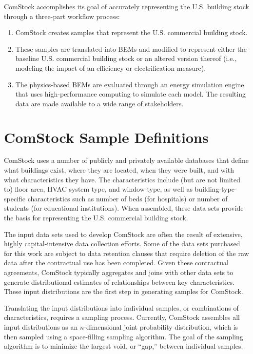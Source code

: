 \pagebreak

ComStock accomplishes its goal of accurately representing the U.S. building stock through a three-part workflow process: \begin{enumerate}
    \item ComStock creates samples that represent the U.S. commercial building stock.
    \item These samples are translated into BEMs and modified to represent either the baseline U.S. commercial building stock or an altered version thereof (i.e., modeling the impact of an efficiency or electrification measure).
    \item The physics-based BEMs are evaluated through an energy simulation engine that uses high-performance computing to simulate each model. The resulting data are made available to a wide range of stakeholders.
\end{enumerate}

\section{ComStock Sample Definitions}
\label{sec:sample_definitions}

ComStock uses a number of publicly and privately available databases that define what buildings exist, where they are located, when they were built, and with what characteristics they have. The characteristics include (but are not limited to) floor area, HVAC system type, and window type, as well as building-type-specific characteristics such as number of beds (for hospitals) or number of students (for educational institutions). When assembled, these data sets provide the basis for representing the U.S. commercial building stock.

The input data sets used to develop ComStock are often the result of extensive, highly capital-intensive data collection efforts. Some of the data sets purchased for this work are subject to data retention clauses that require deletion of the raw data after the contractual use has been completed. Given these contractual agreements, ComStock typically aggregates and joins with other data sets to generate distributional estimates of relationships between key characteristics. These input distributions are the first step in generating samples for ComStock.

Translating the input distributions into individual samples, or combinations of characteristics, requires a sampling process. Currently, ComStock assembles all input distributions as an $n$-dimensional joint probability distribution, which is then sampled using a space-filling sampling algorithm. The goal of the sampling algorithm is to minimize the largest void, or ``gap,'' between individual samples.

